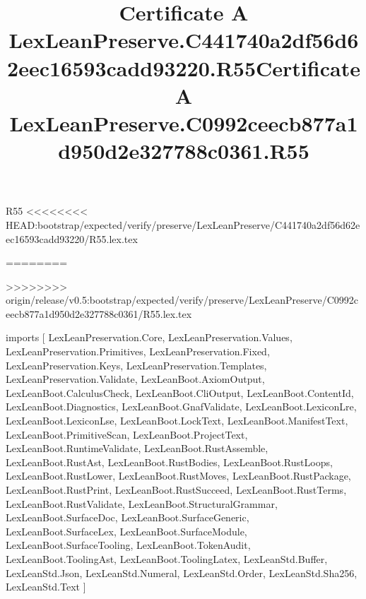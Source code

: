 \begin{lexlean}{R55}
<<<<<<<< HEAD:bootstrap/expected/verify/preserve/LexLeanPreserve/C441740a2df56d62eec16593cadd93220/R55.lex.tex
\title{Certificate A LexLeanPreserve.C441740a2df56d62eec16593cadd93220.R55}
========
\title{Certificate A LexLeanPreserve.C0992ceecb877a1d950d2e327788c0361.R55}
>>>>>>>> origin/release/v0.5:bootstrap/expected/verify/preserve/LexLeanPreserve/C0992ceecb877a1d950d2e327788c0361/R55.lex.tex
\begin{coremodule}
imports [
  LexLeanPreservation.Core,
  LexLeanPreservation.Values,
  LexLeanPreservation.Primitives,
  LexLeanPreservation.Fixed,
  LexLeanPreservation.Keys,
  LexLeanPreservation.Templates,
  LexLeanPreservation.Validate,
  LexLeanBoot.AxiomOutput,
  LexLeanBoot.CalculusCheck,
  LexLeanBoot.CliOutput,
  LexLeanBoot.ContentId,
  LexLeanBoot.Diagnostics,
  LexLeanBoot.GnafValidate,
  LexLeanBoot.LexiconLre,
  LexLeanBoot.LexiconLse,
  LexLeanBoot.LockText,
  LexLeanBoot.ManifestText,
  LexLeanBoot.PrimitiveScan,
  LexLeanBoot.ProjectText,
  LexLeanBoot.RuntimeValidate,
  LexLeanBoot.RustAssemble,
  LexLeanBoot.RustAst,
  LexLeanBoot.RustBodies,
  LexLeanBoot.RustLoops,
  LexLeanBoot.RustLower,
  LexLeanBoot.RustMoves,
  LexLeanBoot.RustPackage,
  LexLeanBoot.RustPrint,
  LexLeanBoot.RustSucceed,
  LexLeanBoot.RustTerms,
  LexLeanBoot.RustValidate,
  LexLeanBoot.StructuralGrammar,
  LexLeanBoot.SurfaceDoc,
  LexLeanBoot.SurfaceGeneric,
  LexLeanBoot.SurfaceLex,
  LexLeanBoot.SurfaceModule,
  LexLeanBoot.SurfaceTooling,
  LexLeanBoot.TokenAudit,
  LexLeanBoot.ToolingAst,
  LexLeanBoot.ToolingLatex,
  LexLeanStd.Buffer,
  LexLeanStd.Json,
  LexLeanStd.Numeral,
  LexLeanStd.Order,
  LexLeanStd.Sha256,
  LexLeanStd.Text
]


\end{coremodule}
\end{lexlean}
